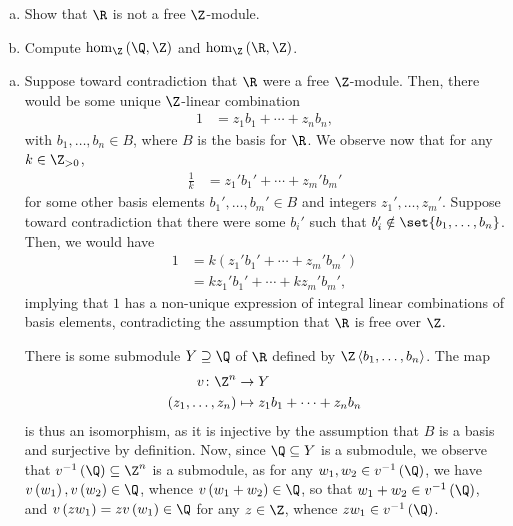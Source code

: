 \documentclass[10pt]{mypackage}
\begin{document}
\RaggedRight
\begin{problem}[Problem 1]\hfill
  \begin{enumerate}[(a)]
    \item Show that $\R$ is not a free $\Z$-module.
    \item Compute $\hom_{\Z}\left( \Q,\Z \right)$ and $\hom_{\Z}\left( \R,\Z \right)$.
  \end{enumerate}
\end{problem}
\begin{solution}\hfill
  \begin{enumerate}[(a)]
    \item Suppose toward contradiction that $\R$ were a free $\Z$-module. Then, there would be some unique $\Z$-linear combination
      \begin{align*}
        1 &= z_1b_1 + \cdots + z_nb_n,
      \end{align*}
      with $b_1,\dots,b_n\in B$, where $B$ is the basis for $\R$. We observe now that for any $k\in \Z_{ > 0 }$,
      \begin{align*}
        \frac{1}{k} &= z_1'b_1' + \cdots + z_m'b_m'
      \end{align*}
      for some other basis elements $b_1',\dots,b_m'\in B$ and integers $z_1',\dots,z_m'$. Suppose toward contradiction that there were some $b_i'$ such that $b_i'\notin \set{b_1,\dots,b_n}$. Then, we would have
      \begin{align*}
        1 &= k\left( z_1'b_1' + \cdots + z_m'b_m' \right)\\
          &= kz_1'b_1' + \cdots + kz_m'b_m',
      \end{align*}
      implying that $1$ has a non-unique expression of integral linear combinations of basis elements, contradicting the assumption that $\R$ is free over $\Z$.\newline

      There is some submodule $Y\supseteq \Q$ of $\R$ defined by $\Z \left\langle b_1,\dots,b_n \right\rangle$. The map
      \begin{align*}
        v\colon \Z^{n}&\rightarrow Y\\
        \left( z_1,\dots,z_n \right) &\mapsto z_1b_1 + \cdots + z_nb_n
      \end{align*}
      is thus an isomorphism, as it is injective by the assumption that $B$ is a basis and surjective by definition. Now, since $\Q\subseteq Y$ is a submodule, we observe that $v^{-1}\left( \Q \right)\subseteq \Z^{n}$ is a submodule, as for any $w_1,w_2\in v^{-1}\left( \Q \right)$, we have $v\left( w_1 \right),v\left( w_2 \right)\in \Q$, whence $v\left( w_1 + w_2 \right)\in \Q$, so that $w_1 + w_2\in v^{-1}\left( \Q \right)$, and $v\left( zw_1 \right) = zv\left( w_1 \right)\in \Q$ for any $z\in \Z$, whence $zw_1\in v^{-1}\left( \Q \right)$.\newline


\end{enumerate}
\end{solution}
\end{document}

